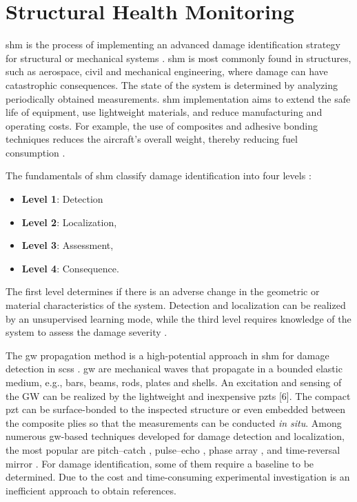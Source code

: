 \section{Structural Health Monitoring}
\label{sec:scm}

\Ac{shm} is the process of implementing an advanced damage identification strategy for structural or mechanical systems \cite{farrar2007introduction}.
\ac{shm} is most commonly found in structures, such as aerospace, civil and mechanical engineering, where damage can have catastrophic consequences.
The state of the system is determined by analyzing periodically obtained measurements.
\ac{shm} implementation aims to extend the safe life of equipment, use lightweight materials, and reduce manufacturing and operating costs.
For example, the use of composites and adhesive bonding techniques reduces the aircraft's overall weight, thereby reducing fuel consumption \cite{scelsi2011potential}.

The fundamentals of \ac{shm} classify damage identification into four levels \cite{rytter1993vibrational}:
\begin{itemize}
	\item[] \textbf{Level 1}: Detection
	\item[] \textbf{Level 2}: Localization,
	\item[] \textbf{Level 3}: Assessment,
	\item[] \textbf{Level 4}: Consequence.
\end{itemize}
The first level determines if there is an adverse change in the geometric or material characteristics of the system.
Detection and localization can be realized by an unsupervised learning mode, while the third level requires knowledge of the system to assess the damage severity \cite{worden2007fundamental}. 


The \ac{gw} propagation method is a high-potential approach in \ac{shm} for
damage detection in \acp{scs} \cite{mustapha2011assessment, sikdar2016guided, sikdar2016ultrasonic,radzienski2016assessment, yu2019core}.
\ac{gw} are mechanical waves that propagate in a bounded
elastic medium, e.g., bars, beams, rods, plates and shells.
An excitation and sensing of the
GW can be realized by the lightweight and inexpensive \acp{pzt} [6].
The compact \ac{pzt} can be surface-bonded to the inspected structure or even embedded between the composite plies so that the measurements can be conducted \textit{in situ}.
Among numerous \ac{gw}-based techniques developed for damage detection and localization, the most popular are pitch--catch \cite{ihn2008pitch, sikdar2017structural}, pulse--echo \cite{guo1993interaction, kudela2008damage}, phase array \cite{lu2006crack, ostachowicz2008elastic}, and time-reversal mirror \cite{fink1992time, eremin2016analytically}.
For damage identification, some of them require a baseline to be determined.
Due to the cost and time-consuming experimental investigation is an inefficient approach to obtain references.

